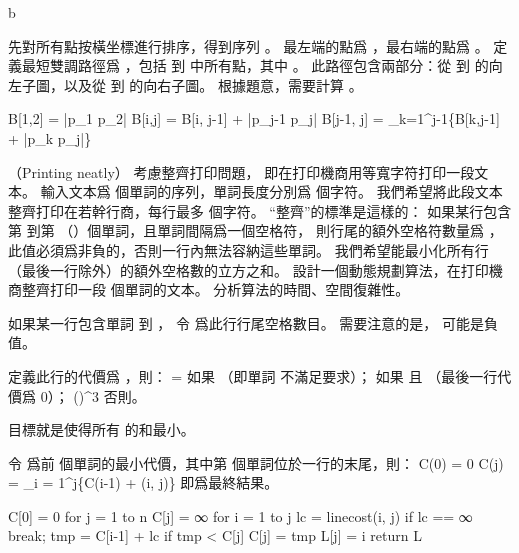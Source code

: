 \startANSWER
{}
{\externalfigure[output/p15_3-2][width=.3\textwidth]}{b}
\stopcombination

先對所有點按橫坐標進行排序，得到序列 。
最左端的點爲 ，最右端的點爲 。
定義最短雙調路徑爲 ，包括  到  中所有點，其中 。
此路徑包含兩部分：從  到  的向左子圖，以及從  到  的向右子圖。
根據題意，需要計算 。

\startformula\startmathalignment
\NC B[1,2] \NC = |p_1 p_2| \NR
\NC B[i,j] \NC = B[i, j-1] + |p_{j-1} p_j| \qquad {} \NR
\NC B[j-1, j] \NC = \min_{k=1}^{j-1}\{B[k,j-1] + |p_k p_j|\} \NR
\stopmathalignment\stopformula
\stopANSWER

\startPROBLEM
（Printing neatly）
考慮整齊打印問題，
即在打印機商用等寬字符打印一段文本。
輸入文本爲  個單詞的序列，單詞長度分別爲  個字符。
我們希望將此段文本整齊打印在若幹行商，每行最多  個字符。
“整齊”的標準是這樣的：
如果某行包含第  到第  （）個單詞，且單詞間隔爲一個空格符，
則行尾的額外空格符數量爲 ，
此值必須爲非負的，否則一行內無法容納這些單詞。
我們希望能最小化所有行（最後一行除外）的額外空格數的立方之和。
設計一個動態規劃算法，在打印機商整齊打印一段  個單詞的文本。
分析算法的時間、空間復雜性。
\stopPROBLEM

\startANSWER
如果某一行包含單詞  到 ，
令  爲此行行尾空格數目。
需要注意的是， \m{\EXTRAS} 可能是負值。

定義此行的代價爲 \m{\LINECOST[i,j]}，則：
\startformula
\LINECOST[i,j] = \startcases
\NC \infty \NC 如果  （即單詞  不滿足要求）； \NR
{} \NC 如果  且  （最後一行代價爲 0）； \NR
\NC (\EXTRAS[i,j])^3 \NC 否則。 \NR
\stopcases
\stopformula

目標就是使得所有 \m{\LINECOST} 的和最小。

令  爲前  個單詞的最小代價，其中第  個單詞位於一行的末尾，則：
\startformula\startmathalignment
\NC C(0) \NC = 0 \NR
\NC C(j) \NC = \min_{i = 1}^{j}\{C(i-1) + \LINECOST(i, j)\} \NR
\stopmathalignment\stopformula
{} 即爲最終結果。

\startCLRS
C[0] = 0
for j = 1 to n
	C[j] = ∞
	for i = 1 to j
		lc = linecost(i, j)
		if lc == ∞
			break;
		tmp = C[i-1] + lc
		if tmp < C[j]
			C[j] = tmp
			L[j] = i
return L
\stopCLRS


